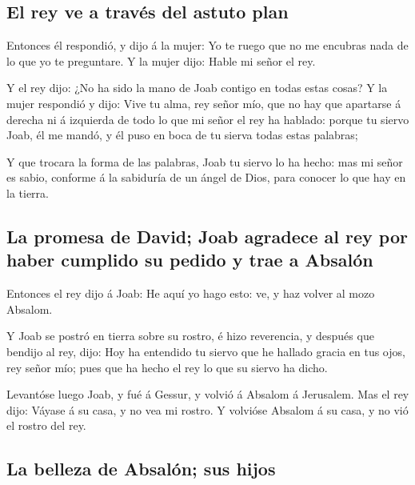\hypertarget{el-rey-ve-a-travuxe9s-del-astuto-plan}{%
\subsection{El rey ve a través del astuto
plan}\label{el-rey-ve-a-travuxe9s-del-astuto-plan}}

 Entonces él respondió, y dijo á la mujer: Yo te ruego
que no me encubras nada de lo que yo te preguntare. Y la mujer dijo:
Hable mi señor el rey.

 Y el rey dijo: ¿No ha sido la mano de Joab contigo en
todas estas cosas? Y la mujer respondió y dijo: Vive tu alma, rey señor
mío, que no hay que apartarse á derecha ni á izquierda de todo lo que mi
señor el rey ha hablado: porque tu siervo Joab, él me mandó, y él puso
en boca de tu sierva todas estas palabras;

 Y que trocara la forma de las palabras, Joab tu siervo
lo ha hecho: mas mi señor es sabio, conforme á la sabiduría de un ángel
de Dios, para conocer lo que hay en la tierra.

\hypertarget{la-promesa-de-david-joab-agradece-al-rey-por-haber-cumplido-su-pedido-y-trae-a-absaluxf3n}{%
\subsection{La promesa de David; Joab agradece al rey por haber cumplido
su pedido y trae a
Absalón}\label{la-promesa-de-david-joab-agradece-al-rey-por-haber-cumplido-su-pedido-y-trae-a-absaluxf3n}}

 Entonces el rey dijo á Joab: He aquí yo hago esto: ve, y
haz volver al mozo Absalom.

 Y Joab se postró en tierra sobre su rostro, é hizo
reverencia, y después que bendijo al rey, dijo: Hoy ha entendido tu
siervo que he hallado gracia en tus ojos, rey señor mío; pues que ha
hecho el rey lo que su siervo ha dicho.

 Levantóse luego Joab, y fué á Gessur, y volvió á Absalom
á Jerusalem.  Mas el rey dijo: Váyase á su casa, y no vea
mi rostro. Y volvióse Absalom á su casa, y no vió el rostro del rey.

\hypertarget{la-belleza-de-absaluxf3n-sus-hijos}{%
\subsection{La belleza de Absalón; sus
hijos}\label{la-belleza-de-absaluxf3n-sus-hijos}}

